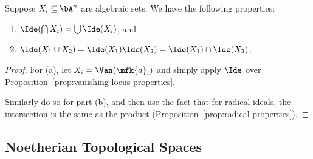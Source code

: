 \begin{proposition}\label{prop:associated-ideal-properties}
    Suppose \(X_i \subseteq \bA^n\) are algebraic sets.
    We have the following properties:
    \begin{enumerate}[label={(\alph*)}, itemsep=0mm]
        \item \(\Ide(\bigcap X_i) = \bigcup \Ide(X_i)\); and
        \item \(\Ide(X_1 \cup X_2) = \Ide(X_1)\Ide(X_2) = \Ide(X_1) \cap \Ide(X_2)\).
    \end{enumerate}
\end{proposition}
\begin{proof}
    For (a), let \(X_i = \Van(\mfk{a}_i)\)
    and simply apply \(\Ide\) over Proposition~\ref{prop:vanishing-locus-properties}.

    Similarly do so for part (b),
    and then use the fact that for radical ideals,
    the intersection is the same as the product
    (Proposition~\ref{prop:radical-properties}).
\end{proof}

\subsection*{Noetherian Topological Spaces}

